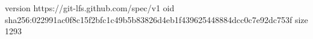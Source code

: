 version https://git-lfs.github.com/spec/v1
oid sha256:022991ac0f8c15f2bfc1c49b5b83826d4eb1f439625448884dcc0c7e92dc753f
size 1293
